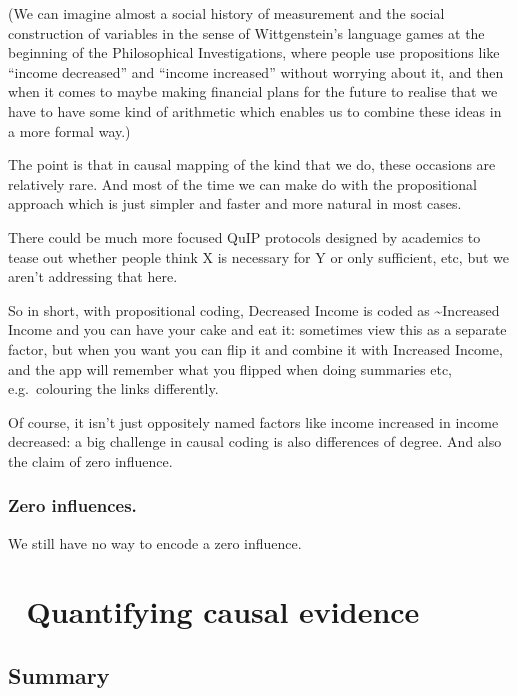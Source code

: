 \documentclass[
]{book}
\begin{document}
(We can imagine almost a social history of measurement and the social construction of variables in the sense of Wittgenstein's
language games at the beginning of the Philosophical Investigations, where people use propositions like ``income decreased'' and ``income increased'' without worrying about it, and then when it comes to maybe making financial plans for the future to realise that we have to have some kind of arithmetic which enables us to combine these ideas in a more formal way.)

The point is that in causal mapping of the kind that we do, these occasions are relatively rare. And most of the time we can make do with the propositional approach which is just simpler and faster and more natural in most cases.

There could be much more focused QuIP protocols designed by academics to tease out whether people think X is necessary for Y or only sufficient, etc, but we aren't addressing that here.

So in short, with propositional coding, Decreased Income is coded as \textasciitilde Increased Income and you can have your cake and eat it: sometimes view this as a separate factor, but when you want you can flip it and combine it with Increased Income, and the app will remember what you flipped when doing summaries etc, e.g.~colouring the links differently.

Of course, it isn't just oppositely named factors like income increased in income decreased: a big challenge in causal coding is also differences of degree. And also the claim of zero influence.

\hypertarget{zero-influences.}{%
\subsection{Zero influences.}\label{zero-influences.}}

We still have no way to encode a zero influence.

\hypertarget{quantifying-causal-evidence}{%
\chapter{🧠 Quantifying causal evidence}\label{quantifying-causal-evidence}}

\hypertarget{summary-2}{%
\section{Summary}\label{summary-2}}
\end{document}
